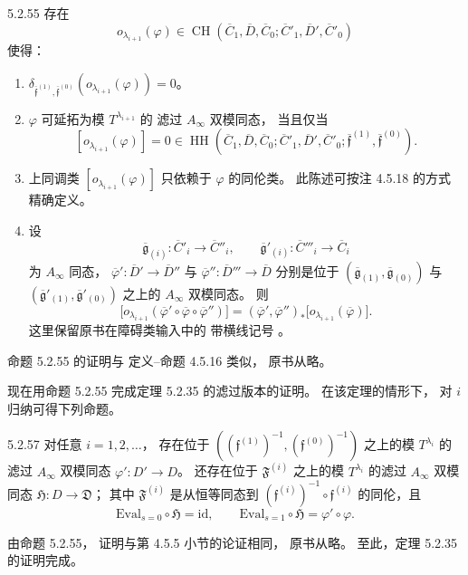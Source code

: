 \begin{proposition}{5.2.55}\label{prop:5-2-55}
存在
\[
o_{\lambda_{i+1}}(\varphi)
\in\operatorname{CH}
(\overline C_1,\overline D,\overline C_0;
 \overline C'_1,\overline D',\overline C'_0)
\]
使得：
\begin{enumerate}[label=\textup{(5.2.56.\arabic*)},leftmargin=5.8em]
\item\label{cond:5-2-56-1}
$\delta_{\overline{\mathfrak f}^{(1)},
          \overline{\mathfrak f}^{(0)}}
(o_{\lambda_{i+1}}(\varphi))=0$。
\item\label{cond:5-2-56-2}
$\varphi$ 可延拓为模
$T^{\lambda_{i+1}}$ 的
滤过 $A_\infty$ 双模同态，
当且仅当
\[
[o_{\lambda_{i+1}}(\varphi)]
=0\in
\operatorname{HH}
(\overline C_1,\overline D,\overline C_0;
 \overline C'_1,\overline D',\overline C'_0;
 \overline{\mathfrak f}^{(1)},
 \overline{\mathfrak f}^{(0)}).
\]
\item\label{cond:5-2-56-3}
上同调类
$[o_{\lambda_{i+1}}(\varphi)]$
只依赖于 $\varphi$ 的同伦类。
此陈述可按注 4.5.18 的方式
精确定义。
\item\label{cond:5-2-56-4}
设
\[
\overline{\mathfrak g}_{(i)}:
\overline C'_i\to\overline C''_i,
\qquad
\overline{\mathfrak g}'_{(i)}:
\overline C'''_i\to\overline C_i
\]
为 $A_\infty$ 同态，
$\overline\varphi':
\overline D'\to\overline D''$
与
$\overline\varphi'':
\overline D'''\to\overline D$
分别是位于
$(\overline{\mathfrak g}_{(1)},
  \overline{\mathfrak g}_{(0)})$
与
$(\overline{\mathfrak g}'_{(1)},
  \overline{\mathfrak g}'_{(0)})$
之上的 $A_\infty$ 双模同态。
则
\[
\bigl[
o_{\lambda_{i+1}}
(\overline\varphi'\circ
 \overline\varphi\circ
 \overline\varphi'')
\bigr]
=
(\overline\varphi',
 \overline\varphi'')_*
\bigl[
o_{\lambda_{i+1}}(\overline\varphi)
\bigr].
\]
这里保留原书在障碍类输入中的
带横线记号
。
\end{enumerate}
\end{proposition}

命题 5.2.55 的证明与
定义--命题 4.5.16 类似，
原书从略。

现在用命题 5.2.55
完成定理 5.2.35 的滤过版本的证明。
在该定理的情形下，
对 $i$ 归纳可得下列命题。

\begin{proposition}{5.2.57}\label{prop:5-2-57}
对任意 $i=1,2,\ldots$，
存在位于
$((\mathfrak f^{(1)})^{-1},
  (\mathfrak f^{(0)})^{-1})$
之上的模 $T^{\lambda_i}$
的滤过 $A_\infty$ 双模同态
$\varphi':D'\to D$。
还存在位于
$\mathfrak F^{(i)}$
之上的模 $T^{\lambda_i}$
的滤过 $A_\infty$ 双模同态
$\mathfrak H:D\to\mathfrak D$；
其中 $\mathfrak F^{(i)}$
是从恒等同态到
$(\mathfrak f^{(i)})^{-1}
\circ\mathfrak f^{(i)}$
的同伦，且
\[
\mathrm{Eval}_{s=0}\circ\mathfrak H
=\mathrm{id},
\qquad
\mathrm{Eval}_{s=1}\circ\mathfrak H
=\varphi'\circ\varphi.
\]
\end{proposition}

由命题 5.2.55，
证明与第 4.5.5 小节的论证相同，
原书从略。
至此，定理 5.2.35 的证明完成。

